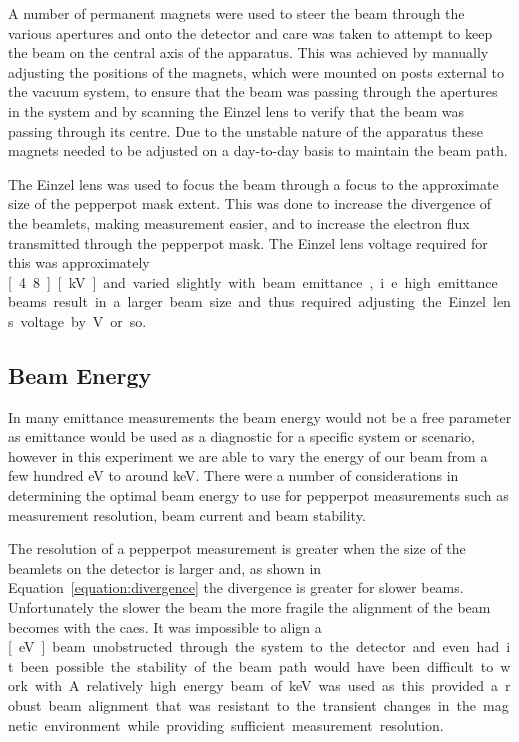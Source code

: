 A number of permanent magnets were used to steer the beam through the various apertures and onto the detector and care was taken to attempt to keep the beam on the central axis of the apparatus.
This was achieved by manually adjusting the positions of the magnets, which were mounted on posts external to the vacuum system, to ensure that the beam was passing through the apertures in the system and by scanning the Einzel lens to verify that the beam was passing through its centre.
Due to the unstable nature of the apparatus these magnets needed to be adjusted on a day-to-day basis to maintain the beam path.

The Einzel lens was used to focus the beam through a focus to the approximate size of the pepperpot mask extent.
This was done to increase the divergence of the beamlets, making measurement easier, and to increase the electron flux transmitted through the pepperpot mask.
The Einzel lens voltage required for this was approximately \unit[4.8][kV] and varied slightly with beam emittance, i.e. high emittance beams result in a larger beam size and thus required adjusting the Einzel lens voltage by \unit[100]{V} or so.

\subsection{Beam Energy}
In many emittance measurements the beam energy would not be a free parameter as emittance would be used as a diagnostic for a specific system or scenario, however in this experiment we are able to vary the energy of our beam from a few hundred eV to around \unit[10]{keV}.
There were a number of considerations in determining the optimal beam energy to use for pepperpot measurements such as measurement resolution, beam current and beam stability.

The resolution of a pepperpot measurement is greater when the size of the beamlets on the detector is larger and, as shown in Equation~\ref{equation:divergence} the divergence is greater for slower beams.
Unfortunately the slower the beam the more fragile the alignment of the beam becomes with the \gls{caes}.
It was impossible to align a \unit[500][eV] beam unobstructed through the system to the detector and even had it been possible the stability of the beam path would have been difficult to work with.
A relatively high energy beam of \unit[8]{keV} was used as this provided a robust beam alignment that was resistant to the transient changes in the magnetic environment while providing sufficient measurement resolution.

